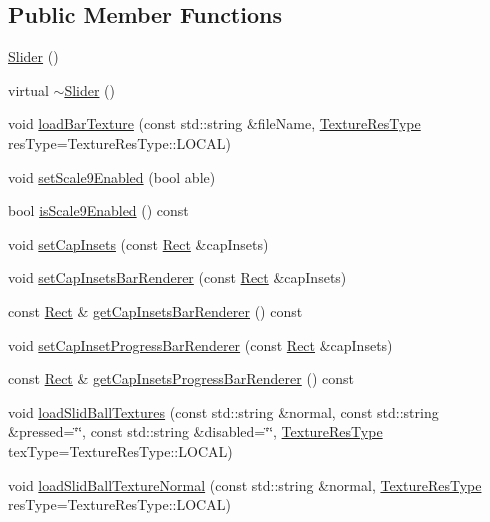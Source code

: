 \subsection*{Public Member Functions}
\begin{DoxyCompactItemize}
\item 
\hyperlink{classui_1_1Slider_ac4d871719e4de62907d10551f34a36f3}{Slider} ()
\item 
virtual \hyperlink{classui_1_1Slider_accf68561bf70429ba8b528c5ebc7bc1f}{$\sim$\+Slider} ()
\item 
void \hyperlink{classui_1_1Slider_a20859a6757a6d477d307e8b70de15805}{load\+Bar\+Texture} (const std\+::string \&file\+Name, \hyperlink{classui_1_1Widget_a040a65ec5ad3b11119b7e16b98bd9af0}{Texture\+Res\+Type} res\+Type=Texture\+Res\+Type\+::\+L\+O\+C\+AL)
\item 
void \hyperlink{classui_1_1Slider_a5bde7358258d6ad46027d92dd0bfa2ca}{set\+Scale9\+Enabled} (bool able)
\item 
bool \hyperlink{classui_1_1Slider_ade445792dc967b0556309956621f787a}{is\+Scale9\+Enabled} () const
\item 
void \hyperlink{classui_1_1Slider_a4b2b8f333375075f9b05f81f2195b52b}{set\+Cap\+Insets} (const \hyperlink{classRect}{Rect} \&cap\+Insets)
\item 
void \hyperlink{classui_1_1Slider_ae0ee53b2a1e339478674a20004f3c26d}{set\+Cap\+Insets\+Bar\+Renderer} (const \hyperlink{classRect}{Rect} \&cap\+Insets)
\item 
const \hyperlink{classRect}{Rect} \& \hyperlink{classui_1_1Slider_a4e4abf03a1ed35279f43e1b448289134}{get\+Cap\+Insets\+Bar\+Renderer} () const
\item 
void \hyperlink{classui_1_1Slider_a842f741bea3f683a5d045cd46e457d36}{set\+Cap\+Inset\+Progress\+Bar\+Renderer} (const \hyperlink{classRect}{Rect} \&cap\+Insets)
\item 
const \hyperlink{classRect}{Rect} \& \hyperlink{classui_1_1Slider_a8445d393893477f86193c57608fc668c}{get\+Cap\+Insets\+Progress\+Bar\+Renderer} () const
\item 
void \hyperlink{classui_1_1Slider_a8bdbd4777a5635376fd5fe205968c247}{load\+Slid\+Ball\+Textures} (const std\+::string \&normal, const std\+::string \&pressed=\char`\"{}\char`\"{}, const std\+::string \&disabled=\char`\"{}\char`\"{}, \hyperlink{classui_1_1Widget_a040a65ec5ad3b11119b7e16b98bd9af0}{Texture\+Res\+Type} tex\+Type=Texture\+Res\+Type\+::\+L\+O\+C\+AL)
\item 
void \hyperlink{classui_1_1Slider_afa65628c541d567403116f5c8dd0f2e4}{load\+Slid\+Ball\+Texture\+Normal} (const std\+::string \&normal, \hyperlink{classui_1_1Widget_a040a65ec5ad3b11119b7e16b98bd9af0}{Texture\+Res\+Type} res\+Type=Texture\+Res\+Type\+::\+L\+O\+C\+AL)

\end{DoxyCompactItemize}
